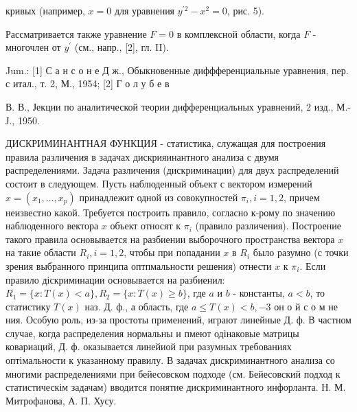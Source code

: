 \documentclass[10pt]{article}
\begin{document}
кривых (например, $x=0$ для уравнения $y^{\prime 2}-x^{2}=0$, рис. 5).



Рассматривается также уравнение $F=0$ в комплексной области, когда $F$ - многочлен от $y^{\prime}$ (см., напр., [2], гл. II).



Jum.: [1] С а н с о н е Д ж., Обыкновенные диффференциальные уравнения, пер. с итал., т. 2, М., 1954; [2] Г о л у б е в

В. В., Јекции по аналитической теории дифференциальных уравнений, 2 изд., М.-Ј., 1950.



ДИСКРИМИНАНТНАЯ ФУНКЦИЯ - статистика, служащая для построения правила различения в задачах дискрияинантного анализа с двумя распределениями. Задача различения (дискриминации) для двух распределений состоит в следующем. Пусть наблюденный объект с вектором измерений $x=\left(x_{1}, \ldots, x_{p}\right)$ принадлежит одной из совокупностей $\pi_{i}, i=1,2$, причем неизвестно какой. Требуется построить правило, согласно к-рому по значению наблюденного вектора $x$ объект относят к $\pi_{i}$ (правило различения). Построение такого правила основывается на разбиении выборочного пространства вектора $x$ на такие области $R_{i}, i=1,2$, чтобы при попадании $x$ в $R_{i}$ было разумно (с точки зрения выбранного принципа оптпмальности решения) отнести $x$ к $\pi_{i}$. Если правило діскриминации основывается на разбиенил: $R_{1}=\{x: T(x)<a\}, R_{2}=\{x: T(x) \geqslant b\}$, где $a$ и $b$ - константы, $a<b$, то статистику $T(x)$ наз. Д. ф., а область, где $a \leqslant T(x)<b,-3$ он о й с о м не ния. Особую роль, из-за простоты применений, играют линейные Д. ф. В частном случае, когда распределения нормальны и пмеют одінаковые матрицы ковариаций, Д. ф. оказывается линейиой при разумных требованиях оптімальности к указанному правилу. В задачах дискриминантного анализа со многими распределениями при бейесовском подходе (см. Бейесовский подход к статистическім задачам) вводится понятие дискриминантного инфорланта. Н. М. Митрофанова, А. П. Хусу.
\end{document}
